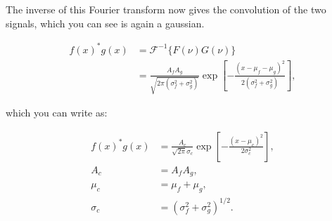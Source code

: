 The inverse of this Fourier transform now gives the convolution of the two signals, which you can see is again a gaussian.

\begin{equation}
\begin{aligned}
f(x)^* g(x) &=  \mathcal{F}^{-1}\{F(\nu)G(\nu)\} \\
&= \frac{A_f A_g}{\sqrt{2\pi\left(\sigma_f^{2}+\sigma_g^{2}\right)}} \exp{\left[-\frac{(x-\mu_f-\mu_g)^{2} }{2\left(\sigma_f^{2}+\sigma_g^{2}\right)}\right]},
\end{aligned}
\end{equation}


which you can write as:

\begin{equation}\label{eq_gauss_conv}
\begin{aligned}
f(x)^* g(x) &= \frac{A_c}{\sqrt{2\pi}\sigma_c} \exp{\left[-\frac{(x-\mu_c)^2}{2\sigma_c^2}\right]},\\
A_c &= A_f A_g,\\
\mu_c &= \mu_f + \mu_g,\\
\sigma_c &= (\sigma_f^2 + \sigma_g^2)^{1/2}.
\end{aligned}
\end{equation}














